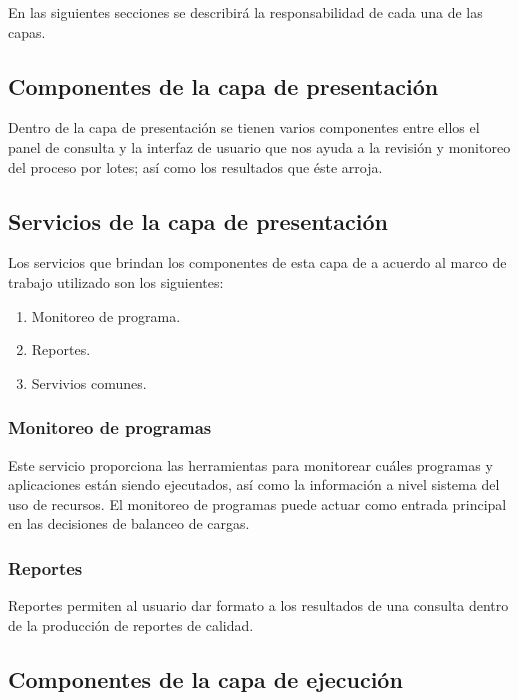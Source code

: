 En las siguientes secciones se describirá la responsabilidad de cada una de las
capas.

\subsection{Componentes de la capa de presentación}

Dentro de la capa de presentación se tienen varios componentes entre ellos el
panel de consulta y la interfaz de usuario que nos ayuda a la revisión y
monitoreo del proceso por lotes; así como los resultados que éste arroja.

\subsection{Servicios de la capa de presentación}

Los servicios que brindan los componentes de esta capa de a acuerdo al marco de
trabajo utilizado son los siguientes:

\begin{enumerate}
\item Monitoreo de programa.
\item Reportes.
\item Servivios comunes.
\end{enumerate}

\subsubsection{Monitoreo de programas}

Este servicio proporciona las herramientas para monitorear cuáles programas y
aplicaciones están siendo ejecutados, así como la información a nivel sistema
del uso de recursos. El monitoreo de programas puede actuar como entrada
principal en las decisiones de balanceo de cargas.

\subsubsection{Reportes}

Reportes permiten al usuario dar formato a los resultados de una consulta dentro
de la producción de reportes de calidad.

\subsection{Componentes de la capa de ejecución}

